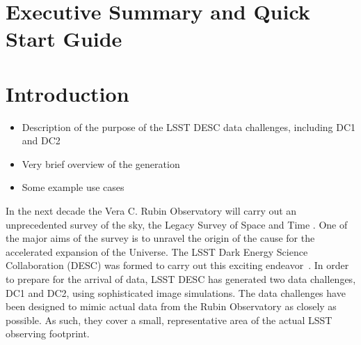\documentclass[11pt]{report}
\begin{document}
\setlength\parindent{0em}
\setlength{\parskip}{0.5em}



\renewcommand{\thepage}{\arabic{page}}
\setcounter{page}{1}

\renewcommand\thefigure{\arabic{figure}}
\setcounter{figure}{0}


\section*{Executive Summary and Quick Start Guide}




\section{Introduction}


\begin{itemize}
\item Description of the purpose of the LSST DESC data challenges, including DC1 and DC2
\item Very brief overview of the generation
\item Some example use cases
\end{itemize}

In the next decade the Vera C. Rubin Observatory will carry out an unprecedented survey of the sky, the Legacy Survey of Space and Time \citep{2009arXiv0912.0201L}. One of the major aims of the survey is to unravel the origin of the cause for the accelerated expansion of the Universe. The LSST Dark Energy Science Collaboration (DESC) was formed to carry out this exciting endeavor~\citep{Abate:2012za}. In order to prepare for the arrival of data, LSST DESC has generated two data challenges, DC1 and DC2, using sophisticated image simulations. The data challenges have been designed to mimic actual data from the Rubin Observatory as closely as possible. As such, they cover a small, representative area of the actual LSST observing footprint. 
\end{document}
